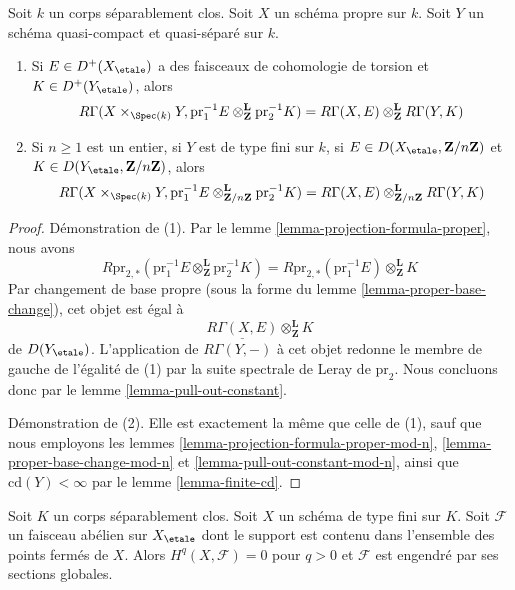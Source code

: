 \begin{lemma}
\label{lemma-kunneth-one-proper}
Soit $k$ un corps séparablement clos. Soit $X$ un schéma propre sur $k$.
Soit $Y$ un schéma quasi-compact et quasi-séparé sur $k$.
\begin{enumerate}
\item Si $E \in D^+(X_\etale)$ a des faisceaux de cohomologie de torsion et
$K \in D^+(Y_\etale)$, alors
$$
R\Gamma(X \times_{\Spec(k)} Y,
\text{pr}_1^{-1}E
\otimes_\mathbf{Z}^\mathbf{L}
\text{pr}_2^{-1}K
)
=
R\Gamma(X, E)
\otimes_\mathbf{Z}^\mathbf{L}
R\Gamma(Y, K)
$$
\item Si $n \geq 1$ est un entier, si $Y$ est de type fini sur $k$,
si $E \in D(X_\etale, \mathbf{Z}/n\mathbf{Z})$ et
$K \in D(Y_\etale, \mathbf{Z}/n\mathbf{Z})$, alors
$$
R\Gamma(X \times_{\Spec(k)} Y,
\text{pr}_1^{-1}E
\otimes_{\mathbf{Z}/n\mathbf{Z}}^\mathbf{L}
\text{pr}_2^{-1}K
)
=
R\Gamma(X, E)
\otimes_{\mathbf{Z}/n\mathbf{Z}}^\mathbf{L}
R\Gamma(Y, K)
$$
\end{enumerate}
\end{lemma}

\begin{proof}
Démonstration de (1). Par le lemme \ref{lemma-projection-formula-proper}, nous avons
$$
R\text{pr}_{2, *}(
\text{pr}_1^{-1}E
\otimes_\mathbf{Z}^\mathbf{L}
\text{pr}_2^{-1}K) =
R\text{pr}_{2, *}(\text{pr}_1^{-1}E)
\otimes_\mathbf{Z}^\mathbf{L}
K
$$
Par changement de base propre (sous la forme du lemme \ref{lemma-proper-base-change}),
cet objet est égal à
$$
\underline{R\Gamma(X, E)}
\otimes_\mathbf{Z}^\mathbf{L}
K
$$
de $D(Y_\etale)$. L'application de $R\Gamma(Y, -)$ à cet objet redonne le
membre de gauche de l'égalité de (1) par la suite spectrale de Leray
de $\text{pr}_2$. Nous concluons donc par le
lemme \ref{lemma-pull-out-constant}.

\medskip\noindent
Démonstration de (2). Elle est exactement la même que celle de (1),
sauf que nous employons les lemmes \ref{lemma-projection-formula-proper-mod-n},
\ref{lemma-proper-base-change-mod-n} et
\ref{lemma-pull-out-constant-mod-n}, ainsi que
$\text{cd}(Y) < \infty$ par le lemme \ref{lemma-finite-cd}.
\end{proof}

\begin{lemma}
\label{lemma-supported-in-closed-points}
Soit $K$ un corps séparablement clos. Soit $X$ un schéma de type
fini sur $K$. Soit $\mathcal{F}$ un faisceau abélien sur $X_\etale$
dont le support est contenu dans l'ensemble des points fermés de $X$.
Alors $H^q(X, \mathcal{F}) = 0$ pour $q > 0$ et $\mathcal{F}$
est engendré par ses sections globales.
\end{lemma}

